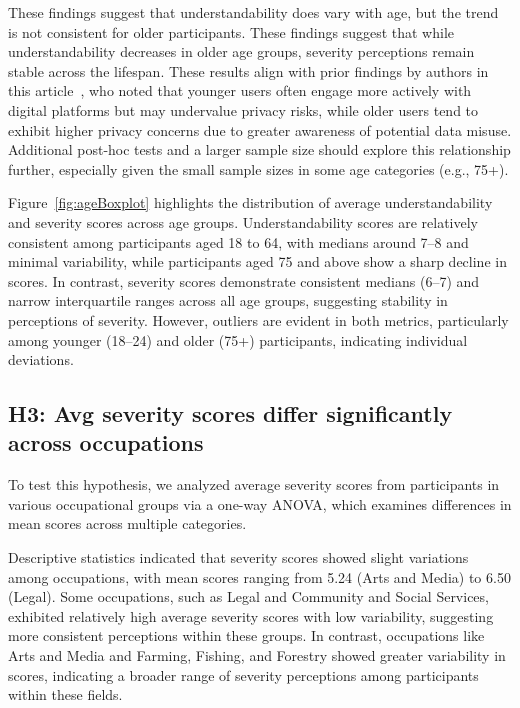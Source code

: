These findings suggest that understandability does vary with age, but the trend is not consistent for older participants. These findings suggest that while understandability decreases in older age groups, severity perceptions remain stable across the lifespan.
These results align with prior findings by authors in this article~\cite{lythreatis2022digital}, who noted that younger users often engage more actively with digital platforms but may undervalue privacy risks, while older users tend to exhibit higher privacy concerns due to greater awareness of potential data misuse.
Additional post-hoc tests and a larger sample size should explore this relationship further, especially given the small sample sizes in some age categories (e.g., 75+).



Figure~\ref{fig:ageBoxplot} highlights the distribution of average understandability and severity scores across age groups.
Understandability scores are relatively consistent among participants aged 18 to 64, with medians around 7--8 and minimal variability, while participants aged 75 and above show a sharp decline in scores.
In contrast, severity scores demonstrate consistent medians (6--7) and narrow interquartile ranges across all age groups, suggesting stability in perceptions of severity.
However, outliers are evident in both metrics, particularly among younger (18--24) and older (75+) participants, indicating individual deviations. 

\subsection{H3: Avg severity scores differ significantly across occupations}

To test this hypothesis, we analyzed average severity scores from participants in various occupational groups via a one-way ANOVA, which examines differences in mean scores across multiple categories.

Descriptive statistics indicated that severity scores showed slight variations among occupations, with mean scores ranging from 5.24 (Arts and Media) to 6.50 (Legal).
Some occupations, such as Legal and Community and Social Services, exhibited relatively high average severity scores with low variability, suggesting more consistent perceptions within these groups.
In contrast, occupations like Arts and Media and Farming, Fishing, and Forestry showed greater variability in scores, indicating a broader range of severity perceptions among participants within these fields.

